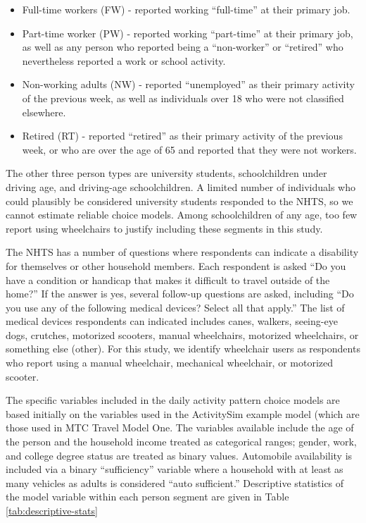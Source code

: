 \documentclass[3p, authoryear, review]{elsarticle} %
\providecommand{\tightlist}{%
  \setlength{\itemsep}{0pt}\setlength{\parskip}{0pt}}
\begin{document}
\begin{itemize}
\tightlist
\item
  Full-time workers (FW) - reported working ``full-time'' at their primary job.
\item
  Part-time worker (PW) - reported working ``part-time'' at their primary job,
  as well as any person who reported being a ``non-worker'' or ``retired'' who nevertheless
  reported a work or school activity.
\item
  Non-working adults (NW) - reported ``unemployed'' as their primary activity
  of the previous week, as well as individuals over 18 who were not classified
  elsewhere.
\item
  Retired (RT) - reported ``retired'' as their primary activity of the previous
  week, or who are over the age of 65 and reported that they were not workers.
\end{itemize}

The other three person types are university students, schoolchildren under
driving age, and driving-age schoolchildren. A limited number of individuals who
could plausibly be considered university students responded to the NHTS, so we
cannot estimate reliable choice models. Among schoolchildren of any age, too few
report using wheelchairs to justify including these segments in this study.

The NHTS has a number of questions where respondents can indicate a disability
for themselves or other household members. Each respondent is asked ``Do you
have a condition or handicap that makes it difficult to travel outside of the
home?'' If the answer is yes, several follow-up questions are asked, including
``Do you use any of the following medical devices? Select all that apply.'' The
list of medical devices respondents can indicated includes canes, walkers,
seeing-eye dogs, crutches, motorized scooters, manual wheelchairs,
motorized wheelchairs, or something else (other).
For this study, we identify wheelchair users as respondents who report using a
manual wheelchair, mechanical wheelchair, or motorized scooter.

The specific variables included in the daily activity pattern choice models
are based initially on the variables used in the ActivitySim example model (which are
those used in MTC Travel Model One. The variables available include the age of
the person and the household income treated as categorical ranges; gender, work,
and college degree status are treated as binary values. Automobile availability is
included via a binary ``sufficiency'' variable where a household with at least as
many vehicles as adults is considered ``auto sufficient.'' Descriptive statistics
of the model variable within each person segment are given in
Table \ref{tab:descriptive-stats}
\end{document}
